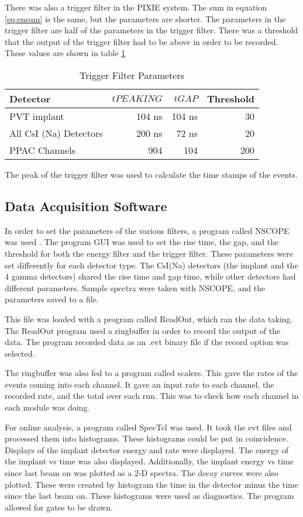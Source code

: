 \documentclass[main.tex]{subfiles}
\begin{document}
There was also a trigger filter in the PIXIE system.
The sum in equation \ref{eq:ensum} is the same, but the parameters are shorter.
The parameters in the trigger filter are half of the parameters in the trigger filter.
There was a threshold that the output of the trigger filter had to be above in order to be recorded.
These values are shown in table \ref{tab:trigfilter}

%
\begin{table}[!hbt]
	\centering
	\caption{Trigger Filter Parameters}
		\begin{tabular}{lrrr}
		Detector & $tPEAKING$ & $tGAP$ & Threshold\\ \hline
		PVT implant & 104 ns & 104 ns & 30 \\ 
		All CsI (Na) Detectors & 200 ns & 72 ns & 20 \\
		PPAC Channels & 904 & 104 & 200 
		\end{tabular}	
		\label{tab:trigfilter}
\end{table}
%

The peak of the trigger filter was used to calculate the time stamps of the events.  

\subsection{Data Acquisition Software}
In order to set the parameters of the various filters, a program called NSCOPE was used \cite{DAQ17}.
The program GUI was used to set the rise time, the gap, and the threshold for both the energy filter and the trigger filter.
These parameters were set differently for each detector type.
The CsI(Na) detectors (the implant and the 4 gamma detectors) shared the rise time and gap time, while other detectors had different parameters.
Sample spectra were taken with NSCOPE, and the parameters saved to a file.

This file was loaded with a program called ReadOut, which ran the data taking.
The ReadOut program used a ringbuffer in order to record the output of the data.
The program recorded data as an .evt binary file if the record option was selected.

The ringbuffer was also fed to a program called scalers.
This gave the rates of the events coming into each channel.
It gave an input rate to each channel, the recorded rate, and the total over each run.
This was to check how each channel in each module was doing.

For online analysis, a program called SpecTcl was used.
It took the evt files and processed them into histograms.
These histograms could be put in coincidence.
Displays of the implant detector energy and rate were displayed.
The energy of the implant vs time was also displayed.
Additionally, the implant energy vs time since last beam on was plotted as a 2-D spectra.
The decay curves were also plotted.
These were created by histogram the time in the detector minus the time since the last beam on.
These histograms were used as diagnostics. 
The program allowed for gates to be drawn.
\end{document}
